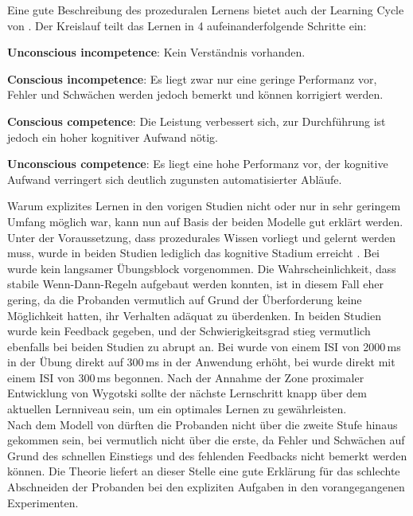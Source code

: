 \documentclass[doc,a4paper,12pt]{apa6}
\begin{document}
Eine gute Beschreibung des prozeduralen Lernens bietet auch der Learning Cycle von \textcite{whitmore2009coaching}. Der Kreislauf teilt das Lernen in 4 aufeinanderfolgende Schritte ein:

\begin{compactenum}
  \item \textbf{Unconscious incompetence}: Kein Verständnis vorhanden.
  \item \textbf{Conscious incompetence}: Es liegt zwar nur eine geringe Performanz vor, Fehler und Schwächen werden jedoch bemerkt und können korrigiert werden.
  \item \textbf{Conscious competence}: Die Leistung verbessert sich, zur Durchführung ist jedoch ein hoher kognitiver Aufwand nötig.
  \item \textbf{Unconscious competence}: Es liegt eine hohe Performanz vor, der kognitive Aufwand verringert sich deutlich zugunsten automatisierter Abläufe.
\end{compactenum}

Warum explizites Lernen in den vorigen Studien \parencites{bendixen2008rapid}{paavilainen2007preattentive} nicht oder nur in sehr geringem Umfang möglich war, kann nun auf Basis der beiden Modelle gut erklärt werden. Unter der Voraussetzung, dass prozedurales Wissen vorliegt und gelernt werden muss, wurde in beiden Studien lediglich das kognitive Stadium erreicht \parencite[nach][]{fitts1967human}. Bei \textcite{bendixen2008rapid} wurde kein langsamer Übungsblock vorgenommen. Die Wahrscheinlichkeit, dass stabile Wenn-Dann-Regeln aufgebaut werden konnten, ist in diesem Fall eher gering, da die Probanden vermutlich auf Grund der Überforderung keine Möglichkeit hatten, ihr Verhalten adäquat zu überdenken. In beiden Studien wurde kein Feedback gegeben, und der Schwierigkeitsgrad stieg vermutlich ebenfalls bei beiden Studien zu abrupt an. Bei \textcite{paavilainen2007preattentive} wurde von einem ISI von 2000\,ms in der Übung direkt auf 300\,ms in der Anwendung erhöht, bei \textcite{bendixen2008rapid} wurde direkt mit einem ISI von 300\,ms begonnen. Nach der Annahme der Zone proximaler Entwicklung von Wygotski \parencite{kozulin2003vygotsky} sollte der nächste Lernschritt knapp über dem aktuellen Lernniveau sein, um ein optimales Lernen zu gewährleisten.\\
Nach dem Modell von \textcite{whitmore2009coaching} dürften die Probanden nicht über die zweite Stufe hinaus gekommen sein, bei \textcite{bendixen2008rapid} vermutlich nicht über die erste, da Fehler und Schwächen auf Grund des schnellen Einstiegs und des fehlenden Feedbacks nicht bemerkt werden können. Die Theorie liefert an dieser Stelle eine gute Erklärung für das schlechte Abschneiden der Probanden bei den expliziten Aufgaben in den vorangegangenen Experimenten.
\end{document}
